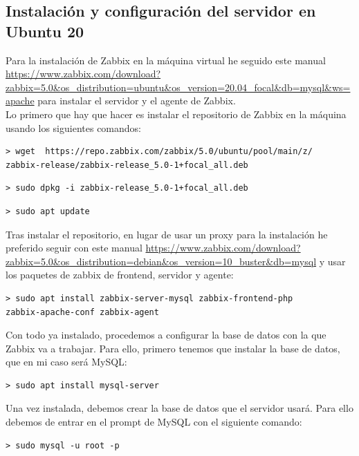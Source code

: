 \subsection{Instalación y configuración del servidor en Ubuntu 20}
Para la instalación de Zabbix en la máquina virtual he seguido este manual 
\url{https://www.zabbix.com/download?zabbix=5.0&os_distribution=ubuntu&os_version=20.04_focal&db=mysql&ws=apache} para instalar el servidor y el agente de Zabbix.\\

Lo primero que hay que hacer es instalar el repositorio de Zabbix en la máquina usando los siguientes comandos:

\begin{lstlisting}
> wget  https://repo.zabbix.com/zabbix/5.0/ubuntu/pool/main/z/
zabbix-release/zabbix-release_5.0-1+focal_all.deb
\end{lstlisting}

\begin{lstlisting}
> sudo dpkg -i zabbix-release_5.0-1+focal_all.deb
\end{lstlisting}

\begin{lstlisting}
> sudo apt update
\end{lstlisting}

Tras instalar el repositorio, en lugar de usar un proxy para la instalación he preferido seguir con este manual \url{https://www.zabbix.com/download?zabbix=5.0&os_distribution=debian&os_version=10_buster&db=mysql} y usar los paquetes de zabbix de frontend, servidor y agente:

\begin{lstlisting}
> sudo apt install zabbix-server-mysql zabbix-frontend-php 
zabbix-apache-conf zabbix-agent 
\end{lstlisting}

Con todo ya instalado, procedemos a configurar la base de datos con la que Zabbix va a trabajar. Para ello, primero tenemos que instalar la base de datos, que en mi caso será MySQL:

\begin{lstlisting}
> sudo apt install mysql-server
\end{lstlisting}

Una vez instalada, debemos crear la base de datos que el servidor usará. Para ello debemos de entrar en el prompt de MySQL con el siguiente comando:

\begin{lstlisting}
> sudo mysql -u root -p
\end{lstlisting}

